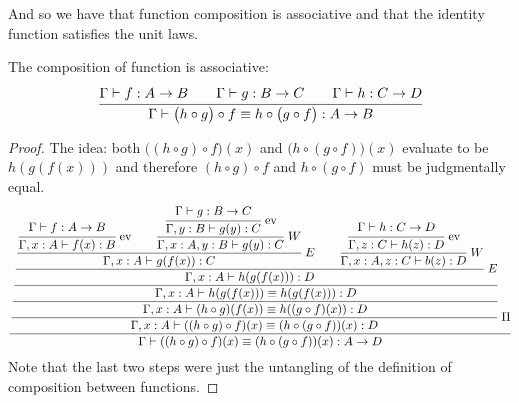 And so we have that function composition is associative and that the identity function satisfies the unit laws.

\begin{lemma}
    The composition of function is associative:
    \begin{equation*}
        \cfrac{\Gamma\vdash f:A\rightarrow B \qquad \Gamma\vdash g:B\rightarrow C\qquad \Gamma\vdash h:C\rightarrow D}{\Gamma\vdash \big(h\circ g\big)\circ f\equiv h\circ\big(g\circ f\big):A\rightarrow B}
    \end{equation*}
\end{lemma}

\begin{dem}
\begin{proof}
    The idea: both $\big((h\circ g)\circ f\big)(x)$ and $\big( h\circ(g\circ f) \big)(x)$ evaluate to be $h(g(f(x)))$ and therefore $(h\circ g)\circ f$ and $h\circ(g\circ f)$ must be judgmentally equal.
    \begin{equation*}
        \cfrac{\cfrac{\cfrac{\cfrac{\cfrac{\cfrac{\cfrac{\Gamma\vdash f:A\to B}{\Gamma, x:A\vdash f(x):B}\text{ ev}\qquad\cfrac{\cfrac{\Gamma\vdash g:B\to C}{\Gamma, y:B\vdash g(y):C}\text{ ev}}{\Gamma, x:A, y:B\vdash g(y):C}\ W}{\Gamma, x:A\vdash g(f(x)):C}\ E\qquad \cfrac{\cfrac{\Gamma\vdash h:C\to D}{\Gamma, z:C\vdash h(z):D}\text{ ev}}{\Gamma, x:A, z:C\vdash b(z):D}\ W}{\Gamma,x:A\vdash h(g(f(x))):D} \ E}{\Gamma,x:A\vdash h(g(f(x)))\equiv h(g(f(x))):D}}{\Gamma,x:A\vdash (h\circ g)(f(x))\equiv h((g\circ f)(x)):D}}{\Gamma,x:A\vdash ((h\circ g)\circ f)(x)\equiv (h\circ(g\circ f))(x):D}\ \Pi}{\Gamma\vdash ((h\circ g)\circ f)(x)\equiv (h\circ(g\circ f))(x):A\to D}
    \end{equation*}
    Note that the last two steps were just the untangling of the definition of composition between functions.
\end{proof}
\end{dem}

